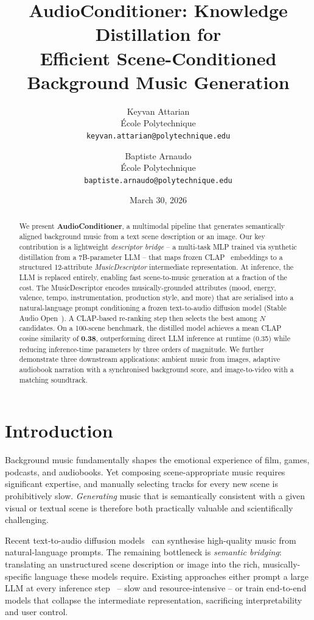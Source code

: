 \documentclass[10pt,twocolumn,letterpaper]{article}
\title{AudioConditioner: Knowledge Distillation for\\
Efficient Scene-Conditioned Background Music Generation}
\author{Keyvan Attarian\\
\'Ecole Polytechnique\\
{\tt\small keyvan.attarian@polytechnique.edu}
\and
Baptiste Arnaudo\\
\'Ecole Polytechnique\\
{\tt\small baptiste.arnaudo@polytechnique.edu}
}
\date{March 30, 2026}
\begin{document}
\maketitle

\begin{abstract}
We present \textbf{AudioConditioner}, a multimodal pipeline that generates
semantically aligned background music from a text scene description or an
image. Our key contribution is a lightweight \emph{descriptor bridge} -- a multi-task MLP trained via synthetic distillation from a 7B-parameter LLM -- that maps frozen CLAP~\cite{elizalde2023clap} embeddings to a structured 12-attribute \emph{MusicDescriptor} intermediate representation. At inference, the LLM is replaced entirely, enabling fast scene-to-music
generation at a fraction of the cost. The MusicDescriptor encodes musically-grounded attributes (mood, energy, valence, tempo, instrumentation, production style, and more) that are serialised into a natural-language prompt conditioning a frozen text-to-audio diffusion model (Stable Audio Open~\cite{evans2024stable}). A CLAP-based re-ranking step then selects the best among $N$ candidates. On a 100-scene benchmark, the distilled model achieves a mean CLAP cosine similarity of \textbf{0.38}, outperforming direct LLM inference at runtime (0.35) while reducing inference-time parameters by three orders of magnitude. We further demonstrate three downstream applications: ambient music from images, adaptive audiobook narration with a synchronised background score, and image-to-video with a matching soundtrack.
\end{abstract}

\section{Introduction}
\label{sec:intro}

Background music fundamentally shapes the emotional experience of film, games,
podcasts, and audiobooks.
Yet composing scene-appropriate music requires significant expertise, and
manually selecting tracks for every new scene is prohibitively slow.
\emph{Generating} music that is semantically consistent with a given visual or
textual scene is therefore both practically valuable and scientifically
challenging.

Recent text-to-audio diffusion models~\cite{evans2024stable, liu2023audioldm2,
copet2023simple} can synthesise high-quality music from natural-language
prompts.
The remaining bottleneck is \emph{semantic bridging}: translating an
unstructured scene description or image into the rich, musically-specific
language these models require.
Existing approaches either prompt a large LLM at every inference
step~\cite{liu2023audioldm2, agostinelli2023musiclm} -- slow and
resource-intensive -- or train end-to-end models that collapse the intermediate
representation, sacrificing interpretability and user control.
\end{document}
